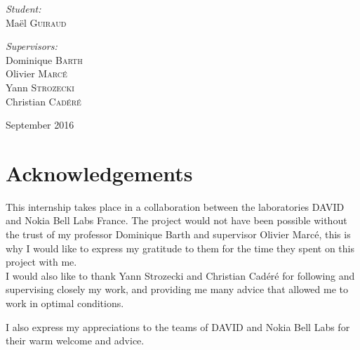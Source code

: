 \documentclass[a4paper,10pt]{report}
\newcommand{\reportauthor}{Maël \textsc{Guiraud }} %
\begin{document}
\begin{titlepage}
\begin{center}
\begin{minipage}[t]{0.3\textwidth}
  \begin{flushleft} \large
    \emph{Student:}\\
    \reportauthor 
  \end{flushleft}
\end{minipage}
\begin{minipage}[t]{0.6\textwidth}
  \begin{flushright} \large
    \emph{Supervisors:} \\
    Dominique \textsc{Barth} \\
    Olivier \textsc{Marcé} \\
    Yann \textsc{Strozecki} \\
    Christian \textsc{Cadéré} \\

  \end{flushright}
\end{minipage}

\vfill

{\large September 2016}

\end{center}

\end{titlepage}

\newpage
\null
\newpage

\section*{Acknowledgements}
This internship takes place in a collaboration between the laboratories DAVID and Nokia Bell Labs France.
The project would not have been possible without the trust of my professor Dominique Barth and supervisor Olivier Marcé, this is why I would like to express my gratitude to them for the time they spent on this project with me.\\

I would also like to thank Yann Strozecki and Christian Cadéré for following and supervising closely my work, and providing me many advice that allowed me to work in optimal conditions.

I also express my appreciations to the teams of DAVID and Nokia Bell Labs for their warm welcome and advice.
\tableofcontents
\end{document}
